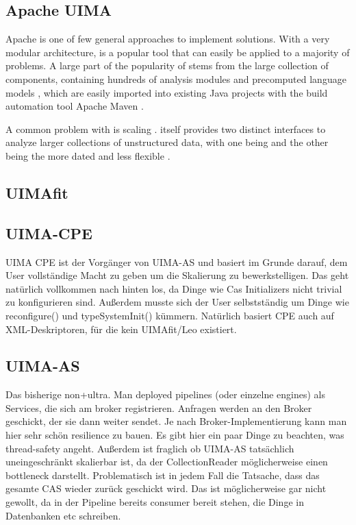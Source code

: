 \subsection{Apache UIMA}

Apache \uima{} is one of few general approaches to implement \nlp{} solutions. With a very modular architecture, \uima{} is a popular tool that can easily be applied to a majority of \nlp{} problems. A large part of the popularity of \uima{} stems from the large \dkpro{} collection of components, containing hundreds of analysis modules and precomputed language models \cite{eckartdecastilho-gurevych:2014:OIAF4HLT}, which are easily imported into existing Java projects with the build automation tool Apache Maven \cite{dkpro}.

A common problem with \uima{} is scaling \cite{divita2015scaling,epstein2012making,ramakrishnan2010building}. \uima{} itself provides two distinct interfaces to analyze larger collections of unstructured data, with one being \uimaas{} and the other being the more dated and less flexible \cpe{} \cite{OASIS:UIMA:2009}.


\subsection{UIMAfit}
\subsection{UIMA-CPE}
UIMA CPE ist der Vorgänger von UIMA-AS und basiert im Grunde darauf, dem User vollständige Macht zu geben um die Skalierung zu bewerkstelligen. Das geht natürlich vollkommen nach hinten los, da Dinge wie Cas Initializers nicht trivial zu konfigurieren sind. Außerdem musste sich der User selbstständig um Dinge wie reconfigure() und typeSystemInit() kümmern. 
Natürlich basiert CPE auch auf XML-Deskriptoren, für die kein UIMAfit/Leo existiert.

\subsection{UIMA-AS}
Das bisherige non+ultra. Man deployed pipelines (oder einzelne engines) als Services, die sich am broker registrieren. Anfragen werden an den Broker geschickt, der sie dann weiter sendet. Je nach Broker-Implementierung kann man hier sehr schön resilience zu bauen. Es gibt hier ein paar Dinge zu beachten, was thread-safety angeht. Außerdem ist fraglich ob UIMA-AS tatsächlich uneingeschränkt skalierbar ist, da der CollectionReader möglicherweise einen bottleneck darstellt. Problematisch ist in jedem Fall die Tatsache, dass das gesamte CAS wieder zurück geschickt wird. Das ist möglicherweise gar nicht gewollt, da in der Pipeline bereits consumer bereit stehen, die Dinge in Datenbanken etc schreiben.

